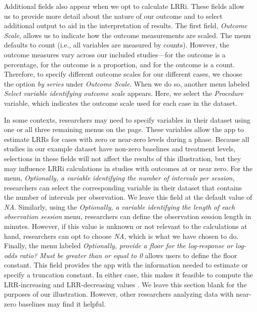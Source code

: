 \documentclass[
]{book}
\begin{document}
Additional fields also appear when we opt to calculate LRRi. These fields allow us to provide more detail about the nature of our outcome and to select additional output to aid in the interpretation of results. The first field, \emph{Outcome Scale}, allows us to indicate how the outcome measurements are scaled. The menu defaults to count (i.e., all variables are measured by counts). However, the outcome measures vary across our included studies---for \citet{Byiers2014} the outcome is a percentage, for \citet{Casey1978} the outcome is a proportion, and for \citet{StrasbergerFerreri2014} the outcome is a count. Therefore, to specify different outcome scales for our different cases, we choose the option \emph{by series} under \emph{Outcome Scale}. When we do so, another menu labeled \emph{Select variable identifying outcome scale} appears. Here, we select the \emph{Procedure} variable, which indicates the outcome scale used for each case in the dataset.

In some contexts, researchers may need to specify variables in their dataset using one or all three remaining menus on the page. These variables allow the app to estimate LRRs for cases with zero or near-zero levels during a phase. Because all studies in our example dataset have non-zero baselines and treatment levels, selections in these fields will not affect the results of this illustration, but they may influence LRRi calculations in studies with outcomes at or near zero. For the menu, \emph{Optionally, a variable identifying the number of intervals per session}, researchers can select the corresponding variable in their dataset that contains the number of intervals per observation. We leave this field at the default value of \emph{NA}. Similarly, using the \emph{Optionally, a variable identifying the length of each observation session} menu, researchers can define the observation session length in minutes. However, if this value is unknown or not relevant to the calculations at hand, researchers can opt to choose \emph{NA}, which is what we have chosen to do. Finally, the menu labeled \emph{Optionally, provide a floor for the log-response or log-odds ratio? Must be greater than or equal to 0} allows users to define the floor constant. This field provides the app with the information needed to estimate or specify a truncation constant. In either case, this makes it feasible to compute the LRR-increasing and LRR-decreasing values \citep[see][\citet{pustejovsky2018Using} for further details]{Pustejovsky2015Measurement}. We leave this section blank for the purposes of our illustration. However, other researchers analyzing data with near-zero baselines may find it helpful.
\end{document}
